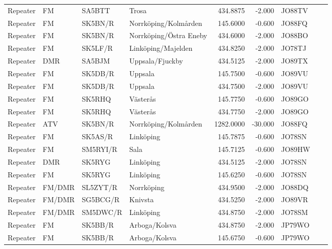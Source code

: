 \begin{longtable}{llllrrlcl}
	Repeater & FM         & SA5BTT   & Trosa                  &   434.8875 &   -2.000 & JO88TV &  &  \\
	Repeater & FM         & SK5BN/R  & Norrköping/Kolmården   &   145.6000 &   -0.600 & JO88FQ &  &  \\
	Repeater & FM         & SK5BN/R  & Norrköping/Östra Eneby &   434.6000 &   -2.000 & JO88BO &  &  \\
	Repeater & FM         & SK5LF/R  & Linköping/Majelden     &   434.8250 &   -2.000 & JO78TJ &  &  \\
	Repeater & DMR        & SA5BJM   & Uppsala/Fjuckby        &   434.5125 &   -2.000 & JO89TX &  &  \\
	Repeater & FM         & SK5DB/R  & Uppsala                &   145.7500 &   -0.600 & JO89VU &  &  \\
	Repeater & FM         & SK5DB/R  & Uppsala                &   434.7500 &   -2.000 & JO89VU &  &  \\
	Repeater & FM         & SK5RHQ   & Västerås               &   145.7750 &   -0.600 & JO89GO &  &  \\
	Repeater & FM         & SK5RHQ   & Västerås               &   434.7750 &   -2.000 & JO89GO &  &  \\
	Repeater & ATV        & SK5BN/R  & Norrköping/Kolmården   &  1282.0000 &  -30.000 & JO88FQ &  &  \\
	Repeater & FM         & SK5AS/R  & Linköping              &   145.7875 &   -0.600 & JO78SN &  &  \\
	Repeater & FM         & SM5RYI/R & Sala                   &   145.7125 &   -0.600 & JO89HW &  &  \\
	Repeater & DMR        & SK5RYG   & Linköping              &   434.5125 &   -2.000 & JO78SN &  &  \\
	Repeater & FM         & SK5RYG   & Linköping              &   145.6250 &   -0.600 & JO78SN &  &  \\
	Repeater & FM/DMR     & SL5ZYT/R & Norrköping             &   434.9500 &   -2.000 & JO88DQ &  &  \\
	Repeater & FM/DMR     & SG5BCG/R & Knivsta                &   434.5250 &   -2.000 & JO89VR &  &  \\
	Repeater & FM/DMR     & SM5DWC/R & Linköping              &   434.8750 &   -2.000 & JO78SM &  &  \\
	Repeater & FM         & SK5BB/R  & Arboga/Kolsva          &   434.8750 &   -2.000 & JP79WO &  &  \\
	Repeater & FM         & SK5BB/R  & Arboga/Kolsva          &   145.6750 &   -0.600 & JP79WO &  &  \\

\end{longtable}
